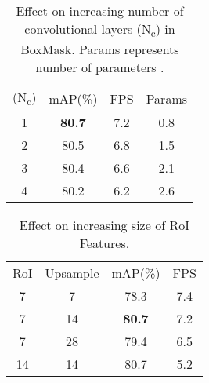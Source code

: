 \documentclass[10pt,twocolumn,letterpaper]{article}
\begin{document}
\begin{minipage}{\linewidth}
\begin{minipage}{0.4\linewidth}
    \vspace{-10pt}
    \begin{table}[H]
      \begin{center}
        {\small{
            \begin{tabular}{c|ccc}
            \toprule
            (N\textsubscript{c}) & mAP(\%) & FPS & Params\\
            \noalign{\smallskip}
            \midrule
            \noalign{\smallskip}
            1 & \textbf{80.7} & 7.2 & 0.8\\
            2 & 80.5 & 6.8& 1.5\\
            3 & 80.4 & 6.6& 2.1\\
            4 & 80.2 & 6.2& 2.6\\
            \bottomrule
            \end{tabular}
            }}
        \end{center}
    \caption{Effect on increasing number of convolutional layers (N\textsubscript{c}) in BoxMask. Params represents number of parameters .}
    \label{table:increasing_conv}
    \end{table}
  \end{minipage}
  \hspace{0.05\linewidth}
  \begin{minipage}{0.4\linewidth}
  \vspace{-50pt}
\begin{table}[H]
  \begin{center}
    {\small{
        \begin{tabular}{cc|cc}
            \toprule
            RoI & Upsample & mAP(\%) & FPS\\
            \noalign{\smallskip}
            \midrule
            \noalign{\smallskip}
            7 & 7 & 78.3 & 7.4\\
            7 & 14 & \textbf{80.7} & 7.2\\
            7 & 28 & 79.4 & 6.5\\
            14 & 14 & 80.7 & 5.2 \\
            \bottomrule
        \end{tabular}
        }}
    \end{center}
        \caption{Effect on increasing size of RoI Features.}
\label{table:roi_size}
\end{table}
  \end{minipage}
\end{minipage}
\end{document}
